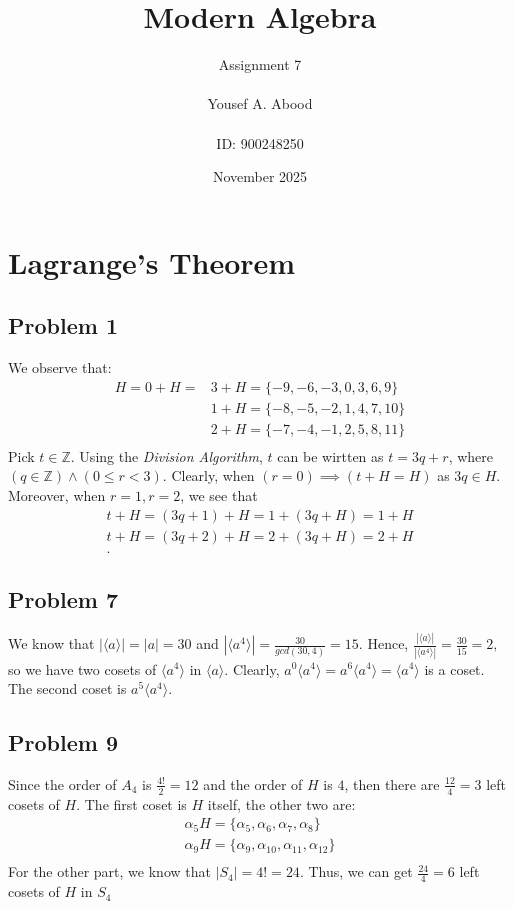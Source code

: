 \documentclass[a4paper,12pt]{article}
\title{Modern Algebra}
\author{Assignment 7\\ \\ Yousef A. Abood\\ \\ ID: 900248250}
\date{November 2025}
\begin{document}
\maketitle
\noindent\makebox[\linewidth]{\rule{15cm}{0.4pt}}
\section{Lagrange’s Theorem}
\subsection*{Problem 1}
We observe that:
\begin{align*}
    H=0+H=&3+H=\{-9, -6, -3,0,3,6,9\}\\
    &1+H=\{-8, -5, -2,1,4,7,10\}\\
    &2+H=\{-7, -4, -1,2,5,8,11\}\\
\end{align*}
Pick $t \in \mathbb{Z}$. Using the \textit{Division Algorithm}, $t$ can be wirtten as $t=3q+r$, where $(q \in \mathbb{Z}) \wedge (0\le r < 3)$. Clearly, when $(r=0) \implies (t+H=H)$ as $3q \in H$. Moreover, when $r=1,r=2$, we see that
\begin{align*}
    t+H=(3q+1)+H=1+(3q+H)=1+H\\
    t+H=(3q+2)+H=2+(3q+H)=2+H\\.
\end{align*}
\subsection*{Problem 7}
We know that $|\langle a \rangle|=|a|=30$ and $|\langle a^4 \rangle|=\frac{30}{gcd(30,4)}=15.$ Hence, $\frac{|\langle a \rangle|}{|\langle a^4 \rangle|}=\frac{30}{15}=2,$ so we have two cosets of $\langle a^4 \rangle$ in $\langle a \rangle.$
Clearly, $a^0\langle a^4 \rangle=a^6\langle a^4 \rangle=\langle a^4 \rangle$ is a coset. The second coset is $a^5\langle a^4 \rangle.$
\subsection*{Problem 9}
Since the order of $A_4$ is $\frac{4!}{2}=12$ and the order of $H$ is $4$, then there are $\frac{12}{4}=3$ left cosets of $H.$ The first coset is $H$ itself, the other two are:
\begin{align*}
    \alpha_5 H=\{\alpha_5, \alpha_6, \alpha_7, \alpha_8 \}\\
    \alpha_9 H=\{\alpha_9, \alpha_{10}, \alpha_{11}, \alpha_{12} \}\\    
\end{align*}
For the other part, we know that $|S_4|=4!=24.$ Thus, we can get $\frac{24}{4}=6$ left cosets of $H$ in $S_4$
\end{document}
